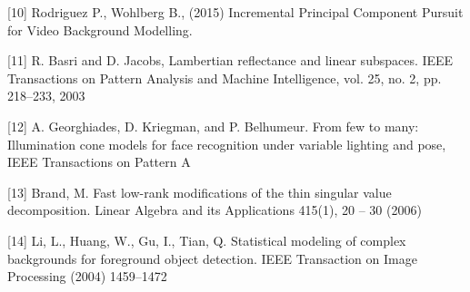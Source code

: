 \documentclass[oneside]{article}
\begin{document}
[10] \hspace*{8pt} Rodriguez P., Wohlberg B., (2015) Incremental Principal Component Pursuit for Video Background Modelling.

[11] \hspace*{8pt} R. Basri and D. Jacobs, Lambertian reflectance and linear subspaces.
IEEE Transactions on Pattern Analysis and Machine Intelligence,
vol. 25, no. 2, pp. 218–233, 2003

[12] \hspace*{8pt} A. Georghiades, D. Kriegman, and P. Belhumeur. From few
to many: Illumination cone models for face recognition under
variable lighting and pose, IEEE Transactions on Pattern A

[13] \hspace*{8pt} Brand, M. Fast low-rank modifications of the thin singular
value decomposition. Linear Algebra and its Applications
415(1), 20 – 30 (2006)

[14] Li, L., Huang, W., Gu, I., Tian, Q. Statistical modeling of complex backgrounds
for foreground object detection. IEEE Transaction on Image Processing (2004)
1459–1472

\fi
\end{document}
